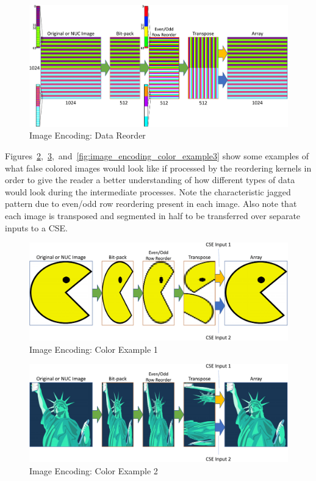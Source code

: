     \begin{figure}
        \centering
        \includegraphics[width=1.0\textwidth]{fig/image_encoding_reorder.pdf}
        \caption{Image Encoding: Data Reorder}
        \label{fig:image_encoding_bitpack_reorder}
    \end{figure}

    Figures~\ref{fig:image_encoding_color_example1},~\ref{fig:image_encoding_color_example2},~and~\ref{fig:image_encoding_color_example3} show some examples of what false colored images would look like if processed by the reordering kernels in order to give the reader a better understanding of how different types of data would look during the intermediate processes. Note the characteristic jagged pattern due to even/odd row reordering present in each image. Also note that each image is transposed and segmented in half to be transferred over separate inputs to a CSE.

    \begin{figure}
        \centering
        \includegraphics[width=1.0\textwidth]{fig/image_encoding_pac.pdf}
        \caption{Image Encoding: Color Example 1}
        \label{fig:image_encoding_color_example1}
    \end{figure}

    \begin{figure}
        \centering
        \includegraphics[width=1.0\textwidth]{fig/image_encoding_liberty.pdf}
        \caption{Image Encoding: Color Example 2}
        \label{fig:image_encoding_color_example2}
    \end{figure}

